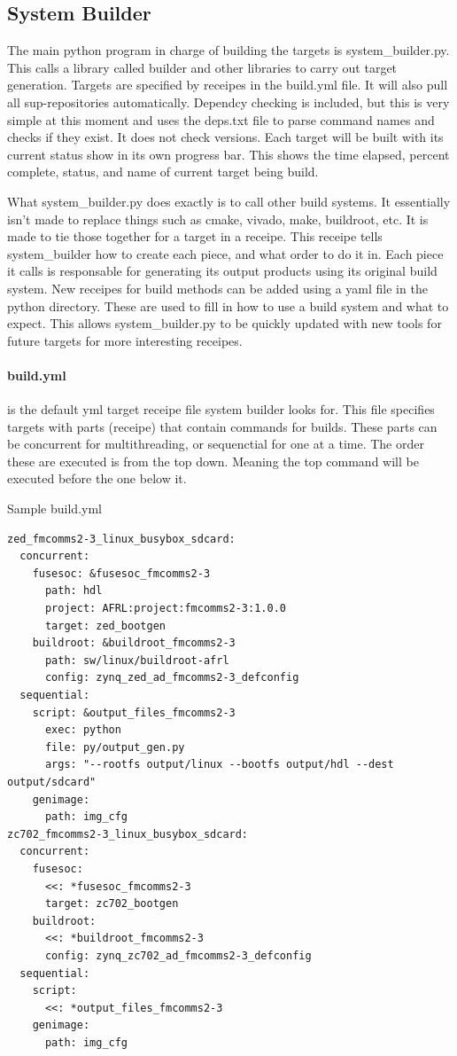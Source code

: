 \subsection{System Builder}

\par
The main python program in charge of building the targets is system\_builder.py. This calls a library called builder and other libraries to carry out target generation.
Targets are specified by receipes in the build.yml file. It will also pull all sup-repositories automatically. Dependcy checking is included, but this is very simple at this moment
and uses the deps.txt file to parse command names and checks if they exist. It does not check versions. Each target will be built with its current status show in its own progress bar.
This shows the time elapsed, percent complete, status, and name of current target being build.
\par
What system\_builder.py does exactly is to call other build systems. It essentially isn't made to replace things such as cmake, vivado, make, buildroot, etc. It is made
to tie those together for a target in a receipe. This receipe tells system\_builder how to create each piece, and what order to do it in. Each piece it calls is responsable for
generating its output products using its original build system. New receipes for build methods can be added using a yaml file in the python directory. These are used to fill in how
to use a build system and what to expect. This allows system\_builder.py to be quickly updated with new tools for future targets for more interesting receipes.

\paragraph{build.yml} is the default yml target receipe file system builder looks for. This file specifies targets with parts (receipe) that contain commands for builds.
These parts can be concurrent for multithreading, or sequenctial for one at a time. The order these are executed is from the top down. Meaning the
top command will be executed before the one below it.

Sample build.yml
\begin{lstlisting}[language={}]
zed_fmcomms2-3_linux_busybox_sdcard:
  concurrent:
    fusesoc: &fusesoc_fmcomms2-3
      path: hdl
      project: AFRL:project:fmcomms2-3:1.0.0
      target: zed_bootgen
    buildroot: &buildroot_fmcomms2-3
      path: sw/linux/buildroot-afrl
      config: zynq_zed_ad_fmcomms2-3_defconfig
  sequential:
    script: &output_files_fmcomms2-3
      exec: python
      file: py/output_gen.py
      args: "--rootfs output/linux --bootfs output/hdl --dest output/sdcard"
    genimage:
      path: img_cfg
zc702_fmcomms2-3_linux_busybox_sdcard:
  concurrent:
    fusesoc:
      <<: *fusesoc_fmcomms2-3
      target: zc702_bootgen
    buildroot:
      <<: *buildroot_fmcomms2-3
      config: zynq_zc702_ad_fmcomms2-3_defconfig
  sequential:
    script:
      <<: *output_files_fmcomms2-3
    genimage:
      path: img_cfg
\end{lstlisting}

